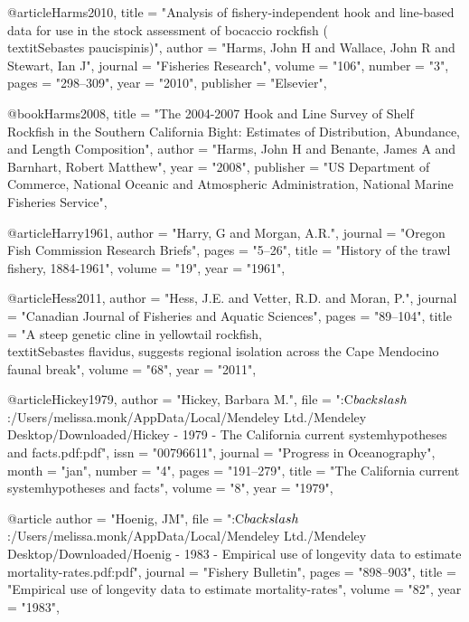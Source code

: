 @article{Harms2010,
    title = "{Analysis of fishery-independent hook and line-based data for use in the stock assessment of bocaccio rockfish (\\textit{{{Sebastes}} paucispinis})}",
    author = "{Harms, John H and Wallace, John R and Stewart, Ian J}",
    journal = "{Fisheries Research}",
    volume = "{106}",
    number = "{3}",
    pages = "{298--309}",
    year = "{2010}",
    publisher = "{Elsevier}",
}

@book{Harms2008,
    title = "{The 2004-2007 Hook and Line Survey of Shelf Rockfish in the Southern California Bight: Estimates of Distribution, Abundance, and Length Composition}",
    author = "{Harms, John H and Benante, James A and Barnhart, Robert Matthew}",
    year = "{2008}",
    publisher = "{US Department of Commerce, National Oceanic and Atmospheric Administration, National Marine Fisheries Service}",
}

@article{Harry1961,
    author = "{Harry, G and Morgan, A.R.}",
    journal = "{Oregon Fish Commission Research Briefs}",
    pages = "{5--26}",
    title = "{{History of the trawl fishery, 1884-1961}}",
    volume = "{19}",
    year = "{1961}",
}

@article{Hess2011,
    author = "{Hess, J.E. and Vetter, R.D. and Moran, P.}",
    journal = "{Canadian Journal of Fisheries and Aquatic Sciences}",
    pages = "{89--104}",
    title = "{{A steep genetic cline in yellowtail rockfish, \\textit{{Sebastes} flavidus}, suggests regional isolation across the Cape Mendocino faunal break}}",
    volume = "{68}",
    year = "{2011}",
}

@article{Hickey1979,
    author = "{Hickey, Barbara M.}",
    file = "{:C$\\backslash$:/Users/melissa.monk/AppData/Local/Mendeley Ltd./Mendeley Desktop/Downloaded/Hickey - 1979 - The California current systemhypotheses and facts.pdf:pdf}",
    issn = "{00796611}",
    journal = "{Progress in Oceanography}",
    month = "jan",
    number = "{4}",
    pages = "{191--279}",
    title = "{{The California current systemhypotheses and facts}}",
    volume = "{8}",
    year = "{1979}",
}

@article{
    author = "{Hoenig, JM}",
    file = "{:C$\\backslash$:/Users/melissa.monk/AppData/Local/Mendeley Ltd./Mendeley Desktop/Downloaded/Hoenig - 1983 - Empirical use of longevity data to estimate mortality-rates.pdf:pdf}",
    journal = "{Fishery Bulletin}",
    pages = "{898--903}",
    title = "{{Empirical use of longevity data to estimate mortality-rates}}",
    volume = "{82}",
    year = "{1983}",
}

